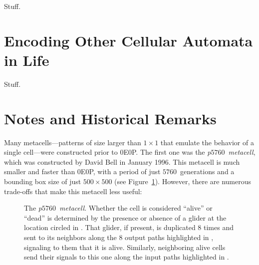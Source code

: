 Stuff.

\section{Encoding Other Cellular Automata in Life}

Stuff.



\section{Notes and Historical Remarks}\label{sec:0e0p_history}

Many metacells---patterns of size larger than $1 \times 1$ that emulate the behavior of a single cell---were constructed prior to 0E0P. The first one was the \emph{p$5760$~metacell}, which was constructed by David Bell in January 1996. This metacell is much smaller and faster than 0E0P, with a period of just $5760$~generations and a bounding box size of just $500 \times 500$ (see Figure~\ref{fig:p5760_metacell}). However, there are numerous trade-offs that make this metacell less useful:\smallskip

\begin{figure}[!htb]
	\centering
	\caption{The \emph{p$5760$~metacell}. Whether the cell is considered ``alive'' or ``dead'' is determined by the presence or absence of a glider at the location circled in . That glider, if present, is duplicated $8$ times and sent to its neighbors along the $8$ output paths highlighted in , signaling to them that it is alive. Similarly, neighboring alive cells send their signals to this one along the input paths highlighted in .}\label{fig:p5760_metacell}
\end{figure}

